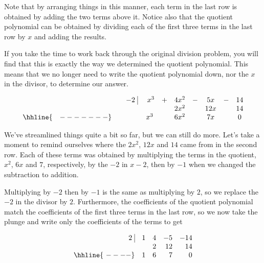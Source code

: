 \setlength\arraycolsep{5pt}
\setlength\extrarowheight{0pt}

Note that by arranging things in this manner, each term in the last row is obtained by adding the two terms above it.  Notice also that the quotient polynomial can be obtained by dividing each of the first three terms in the last row by $x$ and adding the results.   

\medskip

If you take the time to work back through the original division problem, you will find that this is exactly the way we determined the quotient polynomial.  This means that we no longer need to write the quotient polynomial down, nor the $x$ in the divisor, to determine our answer.

\setlength\arraycolsep{0.1pt}
\setlength\extrarowheight{2pt}

\[ \begin{array}{cccccccccc}


 & & - 2 \, \, \vline& \, \, x^3 & + & 4x^2 & - & 5x & - & 14 \\

 &  &  &   & &   2x^2 &  & 12x &  & 14 \\ \hhline{~~~-------} 
 &  &  & x^3  &  & 6 x^2 &  & 7x &  &0  \\  
\end{array}\]

\setlength\arraycolsep{5pt}
\setlength\extrarowheight{0pt}

We've streamlined things quite a bit so far, but we can still do more.  Let's take a moment to remind ourselves where the $2x^2$, $12x$ and $14$ came from in the second row.  Each of these terms was obtained by multiplying the terms in the quotient, $x^2$, $6x$ and $7$, respectively, by the $-2$ in $x-2$,  then by $-1$ when we changed the subtraction to addition. 

\medskip

 Multiplying by $-2$ then by $-1$ is the same as multiplying by $2$, so we replace the $-2$ in the divisor by $2$.   Furthermore, the coefficients of the quotient polynomial match the coefficients of the first three terms in the last row, so we now take the plunge and write only the coefficients of the terms to get



\[ \begin{array}{rrrrr}


  2 \, \, \vline& 1 & 4 & -5  & -14 \\

   &&   2 &   12 &   14 \\ \hhline{~----} 
  & 1  &   6  &  7 &  0  \\  
\end{array}\]



